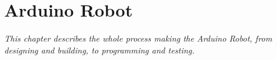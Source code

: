 \chapter{Arduino Robot}
\textit{This chapter describes the whole process making the Arduino Robot, from designing and building, to programming and testing.}%



